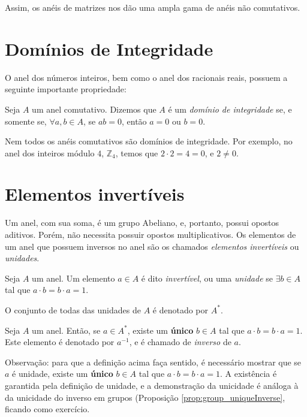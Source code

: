 Assim, os anéis de matrizes nos dão uma ampla gama de anéis não comutativos.
\section{Domínios de Integridade}
O anel dos números inteiros, bem como o anel dos racionais reais, possuem a seguinte importante propriedade:
\begin{definition}
Seja $A$ um anel comutativo. Dizemos que $A$ é um \emph{domínio de integridade} se, e somente se, $\forall a, b \in A$, se $ab=0$, então $a=0$ ou $b=0$.
\end{definition}

Nem todos os anéis comutativos são domínios de integridade. Por exemplo, no anel dos inteiros módulo $4$, $\mathbb Z_4$, temos que $2\cdot 2=4=0$, e $2\neq 0$.

\section{Elementos invertíveis}
Um anel, com sua soma, é um grupo Abeliano, e, portanto, possui opostos aditivos. Porém, não necessita possuir opostos multiplicativos. Os elementos de um anel que possuem inversos no anel são os chamados \emph{elementos invertíveis} ou \emph{unidades}.
\begin{definition}
    Seja $A$ um anel.
    Um elemento $a \in A$ é dito \emph{invertível}, ou uma \emph{unidade} se $\exists b \in A$ tal que $a \cdot b = b \cdot a = 1$.
    
    O conjunto de todas das unidades de $A$ é denotado por $A^*$.
\end{definition}

\begin{definition}
    Seja $A$ um anel.
    Então, se $a \in A^*$, existe um \textbf{único} $b \in A$ tal que $a \cdot b = b \cdot a = 1$. Este elemento é denotado por $a^{-1}$, e é chamado de \emph{inverso} de $a$.
\end{definition}

Observação: para que a definição acima faça sentido, é necessário mostrar que se $a$ é unidade, existe um \textbf{único} $b \in A$ tal que $a \cdot b = b \cdot a = 1$.
A existência é garantida pela definição de unidade, e a demonstração da unicidade é análoga à da unicidade do inverso em grupos (Proposição \ref{prop:group_uniqueInverse}, ficando como exercício.


